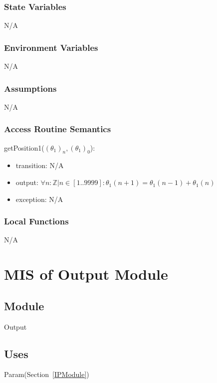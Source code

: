 \documentclass[12pt, titlepage]{article}
\begin{document}
\subsubsection{State Variables}

N/A
\subsubsection{Environment Variables}
N/A
\subsubsection{Assumptions}
N/A
\subsubsection{Access Routine Semantics}

\noindent getPosition1($(\theta_1)_n,(\theta_1)_0$):
\begin{itemize}
\item transition: N/A  
\item output: $\forall n: \mathbb{Z}| n \in[1..9999]: \theta_1(n+1) = \theta_1(n-1) + \theta_1(n)$
\item exception: N/A
\end{itemize}

\subsubsection{Local Functions}

N/A

\newpage

\section{MIS of Output Module} \label{OModule} 




\subsection{Module}

Output

\subsection{Uses}
Param(Section~\ref{IPModule})
\end{document}
